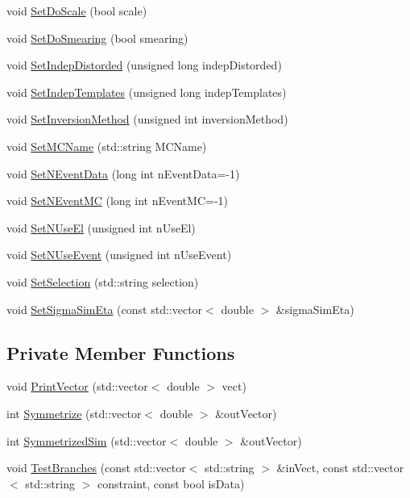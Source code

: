 \begin{DoxyCompactItemize}
\item 
void \hyperlink{classTemplateMethod_1_1Setting_af409657d3ef7c2479e8b88777e9b2a93}{Set\+Do\+Scale} (bool scale)
\item 
void \hyperlink{classTemplateMethod_1_1Setting_a39d14476c0c75a2d35ec2df4bb57bf92}{Set\+Do\+Smearing} (bool smearing)
\item 
void \hyperlink{classTemplateMethod_1_1Setting_aabba4e2b18da5126605172a5a7d08810}{Set\+Indep\+Distorded} (unsigned long indep\+Distorded)
\item 
void \hyperlink{classTemplateMethod_1_1Setting_a348cb5213ed79846680361046f9bba9a}{Set\+Indep\+Templates} (unsigned long indep\+Templates)
\item 
void \hyperlink{classTemplateMethod_1_1Setting_af710031ce676d215b25dbbe5dc2b970e}{Set\+Inversion\+Method} (unsigned int inversion\+Method)
\item 
void \hyperlink{classTemplateMethod_1_1Setting_acee30e7ebec56732e106a9e1bef659d4}{Set\+M\+C\+Name} (std\+::string M\+C\+Name)
\item 
void \hyperlink{classTemplateMethod_1_1Setting_a6e924a7e6a031265fc74988cb4d790fc}{Set\+N\+Event\+Data} (long int n\+Event\+Data=-\/1)
\item 
void \hyperlink{classTemplateMethod_1_1Setting_a6197ca821e92481312399fad3422121b}{Set\+N\+Event\+M\+C} (long int n\+Event\+M\+C=-\/1)
\item 
void \hyperlink{classTemplateMethod_1_1Setting_ae8fad121e73009762bff637b64bde710}{Set\+N\+Use\+El} (unsigned int n\+Use\+El)
\item 
void \hyperlink{classTemplateMethod_1_1Setting_af2d26c4c6b628e4feea0f3edae2a6015}{Set\+N\+Use\+Event} (unsigned int n\+Use\+Event)
\item 
void \hyperlink{classTemplateMethod_1_1Setting_afa2439b4dd56fd5a277a0c4557558084}{Set\+Selection} (std\+::string selection)
\item 
void \hyperlink{classTemplateMethod_1_1Setting_a71bee80efed85d2cebf893722a61aade}{Set\+Sigma\+Sim\+Eta} (const std\+::vector$<$ double $>$ \&sigma\+Sim\+Eta)
\end{DoxyCompactItemize}
\subsection*{Private Member Functions}
\begin{DoxyCompactItemize}
\item 
void \hyperlink{classTemplateMethod_1_1Setting_af142deee141f6c211a4381cd20db2d08}{Print\+Vector} (std\+::vector$<$ double $>$ vect)
\item 
int \hyperlink{classTemplateMethod_1_1Setting_a1c15b0990831a88c2631890a7223127c}{Symmetrize} (std\+::vector$<$ double $>$ \&out\+Vector)
\item 
int \hyperlink{classTemplateMethod_1_1Setting_acbc456e7a6aba0f8cd9fa1e537a6ccd5}{Symmetrized\+Sim} (std\+::vector$<$ double $>$ \&out\+Vector)
\item 
void \hyperlink{classTemplateMethod_1_1Setting_a5c6b6d5a7d9d29e5ce152946d68b24da}{Test\+Branches} (const std\+::vector$<$ std\+::string $>$ \&in\+Vect, const std\+::vector$<$ std\+::string $>$ constraint, const bool is\+Data)
\end{DoxyCompactItemize}
